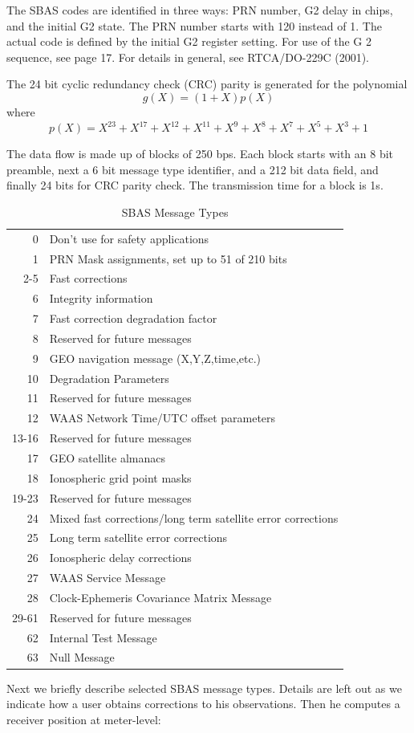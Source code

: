 		The SBAS codes are identified in three ways: PRN number, G2 delay in chips, and the initial G2 state. The PRN number starts with 120 instead of 1. The actual code is defined by the initial G2 register setting. For use of the G 2 sequence, see page 17. For details in general, see RTCA/DO-229C (2001).
		
		The 24 bit cyclic redundancy check (CRC) parity is generated for the polynomial
		\begin{equation*}
			g(X)=(1+X)p(X)
		\end{equation*}
		where
		\begin{equation*}
			p(X)=X^{23}+X^{17}+X^{12}+X^{11}+X^9+X^8+X^7+X^5+X^3+1
		\end{equation*}
		
		The data flow is made up of blocks of 250 bps. Each block starts with an 8 bit preamble, next a 6 bit message type identifier, and a 212 bit data field, and finally 24 bits for CRC parity check. The transmission time for a block is 1s.
		\begin{table}[h]
			\centering
			\caption{SBAS Message Types}
			\label{tab:9.9}
			\begin{tabular}{rl}
				\hline
				0 & Don’t use for safety applications \\
				1 & PRN Mask assignments, set up to 51 of 210 bits\\
				2-5 & Fast corrections\\
				6 & Integrity information\\
				7 & Fast correction degradation factor\\
				8 & Reserved for future messages\\
				9 & GEO navigation message (X,Y,Z,time,etc.)\\
				10 & Degradation Parameters\\
				11 & Reserved for future messages\\
				12 & WAAS Network Time/UTC offset parameters\\
				13-16 & Reserved for future messages\\
				17 & GEO satellite almanacs\\
				18 & Ionospheric grid point masks\\
				19-23 & Reserved for future messages\\
				24 & Mixed fast corrections/long term satellite error corrections\\
				25 & Long term satellite error corrections\\
				26 & Ionospheric delay corrections\\
				27 & WAAS Service Message\\
				28 & Clock-Ephemeris Covariance Matrix Message\\
				29-61 & Reserved for future messages\\
				62 & Internal Test Message\\
				63 & Null Message\\
				\hline
			\end{tabular} 
		\end{table}
		Next we briefly describe selected SBAS message types. Details are left out as we indicate how a user obtains corrections to his observations. Then he computes a receiver position at meter-level:
		
